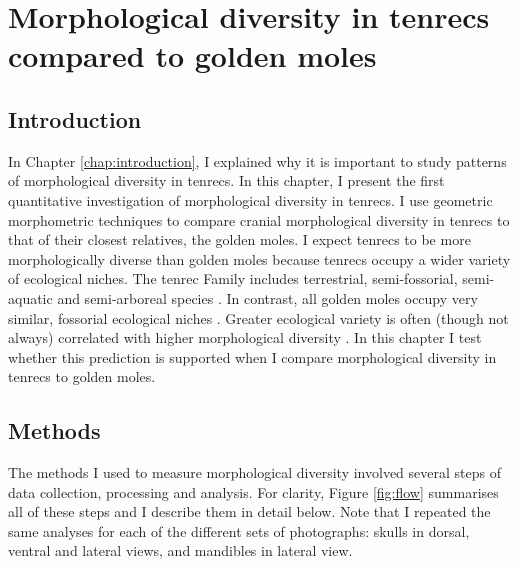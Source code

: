 \chapter{Morphological diversity in tenrecs compared to golden moles}
\label{chap:disparity}


\section{Introduction}
	In Chapter \ref{chap:introduction}, I explained why it is important to study patterns of morphological diversity in tenrecs. In this chapter, I present the first quantitative investigation of morphological diversity in tenrecs. I use geometric morphometric techniques \citep{Rohlf1993} to compare cranial morphological diversity in tenrecs to that of their closest relatives, the golden moles. 
	I expect tenrecs to be more morphologically diverse than golden moles because tenrecs occupy a wider variety of ecological niches. The tenrec Family includes terrestrial, semi-fossorial, semi-aquatic and semi-arboreal species \citep{Soarimalala2011}. In contrast, all golden moles occupy very similar, fossorial ecological niches \citep{Bronner1995}. 
	Greater ecological variety is often (though not always) correlated with higher morphological diversity \citep{Losos2010a}. In this chapter I test whether this prediction is supported when I compare morphological diversity in tenrecs to golden moles.

\section{Methods}

	The methods I used to measure morphological diversity involved several steps of data collection, processing and analysis. For clarity,  Figure \ref{fig:flow} summarises all of these steps and I describe them in detail below. Note that I repeated the same analyses for each of the different sets of photographs: skulls in dorsal, ventral and lateral views, and mandibles in lateral view.
	

